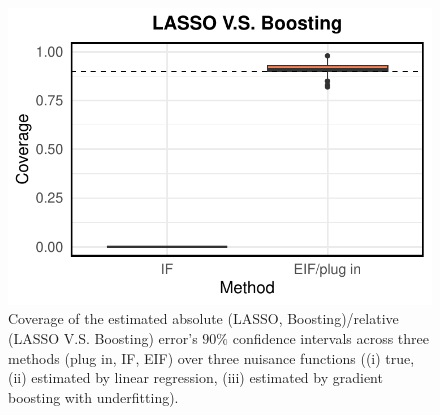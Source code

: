 \documentclass{article}
\theoremstyle{plain}
\theoremstyle{definition}
\theoremstyle{plain}
\begin{document}
\begin{figure}[h]
\begin{minipage}{0.3\textwidth}
                \includegraphics[clip, trim = 0cm 0cm 0cm 0cm, width = \textwidth]{plot/simulation_gradient_boosting_coverage_LASSO_V.S._Boosting.pdf}
        \end{minipage}        
        \caption{ 
        Coverage of the estimated absolute (LASSO, Boosting)/relative (LASSO V.S. Boosting) error's $90\%$ confidence intervals across three methods (plug in, IF, EIF) over three nuisance functions ((i) true, (ii) estimated by linear regression, (iii) estimated by gradient boosting with underfitting).
        }
    \label{fig:simulation.coverage}
\end{figure}
\end{document}
